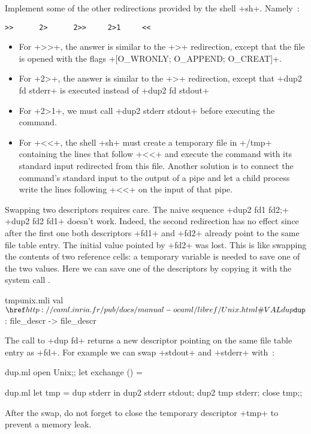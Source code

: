 \begin{exercise}
Implement some of the other redirections provided by the shell
\ml+sh+. Namely~: 
%
\begin{lstlisting}
>>      2>      2>>     2>1     <<
\end{lstlisting}
%
\end{exercise}
\begin{answer}
\begin{itemize}
\item For \ml+>>+, the answer is similar to the \ml+>+ redirection, except that the
file  is opened with the flags \ml+[O_WRONLY; O_APPEND; O_CREAT]+.
%
\item For \ml+2>+, the answer is similar to the \ml+>+ redirection, except that
\ml+dup2 fd stderr+ is executed instead of \ml+dup2 fd stdout+
%
\item For \ml+2>1+, we must call \ml+dup2 stderr stdout+ before executing
the command.
%
\item For \ml+<<+, the shell \ml+sh+ must create a temporary file in
\ml+/tmp+ containing the lines that follow \ml+<<+ and execute the 
command with its standard input redirected from this file. Another 
solution is to connect the command's standard input to the output of a 
pipe and let a child process write the lines following \ml+<<+ on the
input of that pipe.
\end{itemize}
\end{answer}

Swapping two descriptors requires care. The naive sequence
\ml+dup2 fd1 fd2;+ \ml+dup2 fd2 fd1+ doesn't work. Indeed, the second
redirection has no effect since after the first one both descriptors
\ml+fd1+ and \ml+fd2+ already point to the same file table entry.  The
initial value pointed by \ml+fd2+ was lost. This is like swapping the
contents of two reference cells: a temporary variable is needed to
save one of the two values. Here we can save one of the
descriptors by copying it with the system call .
%
\begin{listingcodefile}{tmpunix.mli}
val $\libvalue{Unix}{dup}$ : file_descr -> file_descr
\end{listingcodefile}
%
The call to \ml+dup fd+ returns a new descriptor pointing on the same
file table entry as \ml+fd+. For example we can swap \ml+stdout+ and 
\ml+stderr+ with~:
%
\begin{codefile}{dup.ml}
open Unix;;
let exchange () = 
\end{codefile}
%
\begin{listingcodefile}{dup.ml}
let tmp = dup stderr in
dup2 stderr stdout; 
dup2 tmp stderr;
close tmp;;
\end{listingcodefile}
% 
After the swap, do not forget to close the temporary descriptor
\ml+tmp+ to prevent a memory leak.

